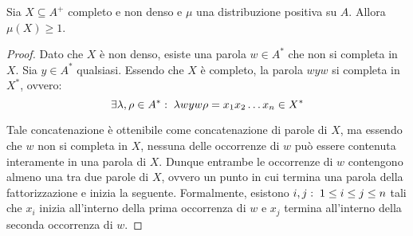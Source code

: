 \begin{lemma}
  Sia \(X \subseteq A^+\) completo e non denso e \(\mu\) una distribuzione positiva su \(A\).
  Allora \(\mu(X) \geq 1\).
\end{lemma}
\begin{proof}
  Dato che \(X\) è non denso, esiste una parola \(w \in A^*\) che non si completa in \(X\).
  Sia \(y \in A^*\) qualsiasi.
  Essendo che \(X\) è completo, la parola \(wyw\) si completa in \(X^*\), ovvero:
  \[\exists \lambda,\rho \in A^*:\; \lambda w y w \rho  = x_1x_2\ldots x_n\in X^*\]
  \begin{figure}[H]
    \centering
  \end{figure}

  Tale concatenazione è ottenibile come concatenazione di parole di \(X\), ma essendo che \(w\) non si completa in \(X\), nessuna delle occorrenze di \(w\) può essere contenuta interamente in una parola di \(X\).
  Dunque entrambe le occorrenze di \(w\) contengono almeno una  tra due parole di \(X\), ovvero un punto in cui termina una parola della fattorizzazione e inizia la seguente.
  Formalmente, esistono \(i,j :\; 1 \leq i \leq j \leq n\) tali che \(x_i\) inizia all'interno della prima occorrenza di \(w\) e \(x_j\) termina all'interno della seconda occorrenza di \(w\).


\end{proof}
